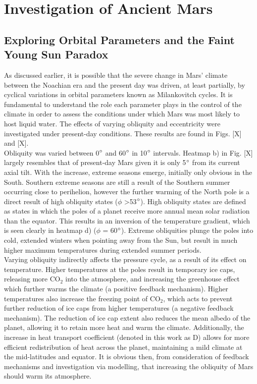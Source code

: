 \documentclass[12pt,onecolumn]{revtex4-2}    %
\begin{document}
\section{Investigation of Ancient Mars}
\subsection{Exploring Orbital Parameters and the Faint Young Sun Paradox}

As discussed earlier, it is possible that the severe change in Mars' climate between the Noachian era and the present day was driven, at least partially, by cyclical variations in orbital parameters known as Milankovitch cycles. It is fundamental to understand the role each parameter plays in the control of the climate in order to assess the conditions under which Mars was most likely to host liquid water. The effects of varying obliquity and eccentricity were investigated under present-day conditions. These results are found in Figs. [X] and [X].
\\

Obliquity was varied between 0$\degree$ and 60$\degree$ in 10$\degree$ intervals. Heatmap b) in Fig. [X] largely resembles that of present-day Mars given it is only 5$\degree$ from its current axial tilt. With the increase, extreme seasons emerge, initially only obvious in the South. Southern extreme seasons are still a result of the Southern summer occurring close to perihelion, however the further warming of the North pole is a direct result of high obliquity states ($\phi$ \textgreater 53$\degree$). High obliquity states are defined as states in which the poles of a planet receive more annual mean solar radiation than the equator. This results in an inversion of the temperature gradient, which is seen clearly in heatmap d) ($\phi$ = 60$\degree$). Extreme obliquities plunge the poles into cold, extended winters when pointing away from the Sun, but result in much higher maximum temperatures during extended summer periods.
\\

Varying obliquity indirectly affects the pressure cycle, as a result of its effect on temperature. Higher temperatures at the poles result in temporary ice caps, releasing more $\mathrm{CO_2}$ into the atmosphere, and increasing the greenhouse effect which further warms the climate (a positive feedback mechanism). Higher temperatures also increase the freezing point of $\mathrm{CO_2}$, which acts to prevent further reduction of ice caps from higher temperatures (a negative feedback mechanism). The reduction of ice cap extent also reduces the mean albedo of the planet, allowing it to retain more heat and warm the climate. Additionally, the increase in heat transport coefficient (denoted in this work as D) allows for more efficient redistribution of heat across the planet, maintaining a mild climate at the mid-latitudes and equator. It is obvious then, from consideration of feedback mechanisms and investigation via modelling, that increasing the obliquity of Mars should warm its atmosphere.
\
\end{document}

